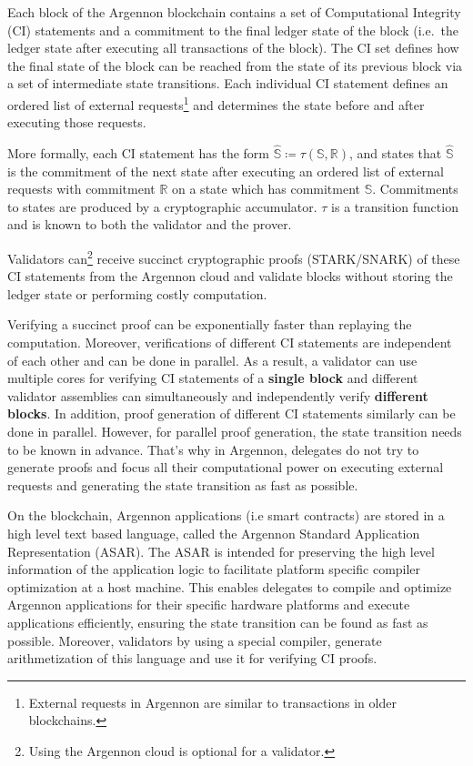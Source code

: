Each block of the Argennon blockchain contains a set of Computational Integrity (CI) statements and a commitment to
the final ledger state of the block (i.e.\ the ledger state after executing all transactions of the block). The CI
set defines how the final state of the block can be reached from
the state of its previous block via a set of intermediate state transitions. Each individual CI statement defines
an ordered list of external requests\footnote{External requests in Argennon are
similar to transactions in older blockchains.} and determines the state before and after executing those requests.

More formally, each CI statement has the form
$\hat{\mathbb{S}} \coloneqq \tau(\mathbb{S}, \mathbb{R})$, and states that
$\hat{\mathbb{S}}$ is the commitment of the next state after executing an ordered list of external requests with
commitment $\mathbb{R}$ on a state which has commitment $\mathbb{S}$.
Commitments to states are produced by a cryptographic accumulator. $\tau$ is a transition function and is known to
both the validator and the prover.

Validators can\footnote{Using the Argennon cloud is optional for a validator.} receive succinct cryptographic proofs
(STARK/SNARK) of these CI statements from the Argennon cloud and validate blocks without storing the ledger
state or performing costly computation.

Verifying a succinct proof can be exponentially faster than replaying the computation. Moreover, verifications of
different CI statements are independent of each other and can be done in parallel. As a result, a validator can use
multiple cores for verifying CI statements of a \textbf{single block} and different validator assemblies can
simultaneously and
independently verify \textbf{different blocks}.
In addition, proof generation of different CI statements similarly can be done in parallel. However, for parallel
proof generation, the state transition needs to be known in advance. That's why in Argennon, delegates do not try
to generate proofs and focus all their computational power on executing external requests and
generating the state transition as fast as possible.

On the blockchain, Argennon applications (i.e smart contracts) are stored in a high level text based language, called
the Argennon Standard Application Representation (ASAR). The ASAR is intended for preserving the
high level information of the application logic to facilitate platform specific compiler optimization at a host
machine. This enables delegates to compile and optimize Argennon applications for their specific hardware platforms
and execute applications efficiently, ensuring the state transition can be found as fast as possible. Moreover,
validators by using a special compiler, generate arithmetization of this language and use it for verifying CI proofs.

